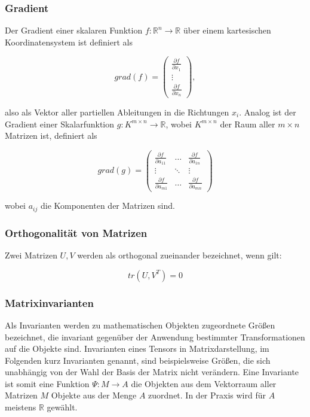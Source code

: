 \documentclass[a4paper,fontsize=12pt,toc=bib,parskip=half,ngerman]{scrartcl}
\begin{document}
\subsubsection{Gradient}
Der Gradient einer skalaren Funktion $f: \mathbb{R}^n \rightarrow \mathbb{R}$  \"uber einem kartesischen Koordinatensystem ist definiert als

\begin{equation}
	grad(f) = 	
	\begin{pmatrix}
		\frac{\partial f}{\partial x_1} \\
		\vdots \\
		\frac{\partial f}{\partial x_n}
	\end{pmatrix},
\end{equation}

also als Vektor aller partiellen Ableitungen in die Richtungen $x_i$. Analog ist der Gradient einer Skalarfunktion $g: K^{m\times n} \rightarrow \mathbb{R}$, wobei $K^{m\times n}$ der Raum aller $m\times n$ Matrizen ist, definiert als

\begin{equation}
	grad(g) =
	\begin{pmatrix}
		\frac{\partial f}{\partial a_{11}} & \dots & \frac{\partial f}{\partial a_{1n}}  \\
		\vdots & \ddots & \vdots \\
		\frac{\partial f}{\partial a_{m1}} & \dots & \frac{\partial f}{\partial a_{mn}} 
	\end{pmatrix}
\end{equation}

wobei $a_{ij}$ die Komponenten der Matrizen sind.

\subsubsection{Orthogonalit\"at von Matrizen}
Zwei Matrizen $U,V$ werden als orthogonal zueinander bezeichnet, wenn \cite{ennis2006orthogonal} gilt:

\begin{equation}
tr(U,V^{T}) = 0
\end{equation}

\subsubsection{Matrixinvarianten}
\label{Matrixinvarianten}
Als Invarianten werden zu mathematischen Objekten zugeordnete Gr\"o{\ss}en bezeichnet, die invariant gegen\"uber der Anwendung bestimmter Transformationen auf die Objekte sind. Invarianten eines Tensors in Matrixdarstellung, im Folgenden kurz Invarianten genannt, sind beispielsweise Gr\"o{\ss}en, die sich unabh\"angig von der Wahl der Basis der Matrix nicht ver\"andern\cite{ennis2006orthogonal}. Eine Invariante ist somit eine Funktion $\Psi: M \rightarrow A$ die Objekten aus dem Vektorraum aller Matrizen $M$ Objekte aus der Menge $A$ zuordnet. In der Praxis wird f\"ur $A$ meistens $\mathbb{R}$ gew\"ahlt.
\end{document}
